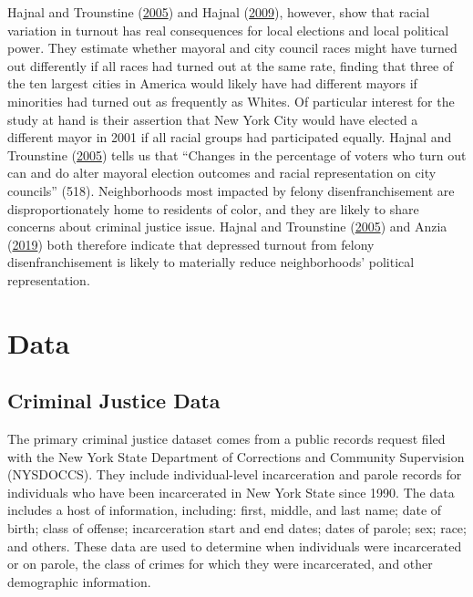 \documentclass[12pt,]{article}
\begin{document}
Hajnal and Trounstine (\protect\hyperlink{ref-Hajnal2005}{2005}) and Hajnal (\protect\hyperlink{ref-Hajnal2009}{2009}), however, show that racial variation in turnout has real consequences for local elections and local political power. They estimate whether mayoral and city council races might have turned out differently if all races had turned out at the same rate, finding that three of the ten largest cities in America would likely have had different mayors if minorities had turned out as frequently as Whites. Of particular interest for the study at hand is their assertion that New York City would have elected a different mayor in 2001 if all racial groups had participated equally. Hajnal and Trounstine (\protect\hyperlink{ref-Hajnal2005}{2005}) tells us that ``Changes in the percentage of voters who turn out can and do alter mayoral election outcomes and racial representation on city councils'' (518). Neighborhoods most impacted by felony disenfranchisement are disproportionately home to residents of color, and they are likely to share concerns about criminal justice issue. Hajnal and Trounstine (\protect\hyperlink{ref-Hajnal2005}{2005}) and Anzia (\protect\hyperlink{ref-Anzia2019}{2019}) both therefore indicate that depressed turnout from felony disenfranchisement is likely to materially reduce neighborhoods' political representation.

\hypertarget{data}{%
\section*{Data}\label{data}}

\hypertarget{criminal-justice-data}{%
\subsection*{Criminal Justice Data}\label{criminal-justice-data}}

The primary criminal justice dataset comes from a public records request filed with the New York State Department of Corrections and Community Supervision (NYSDOCCS). They include individual-level incarceration and parole records for individuals who have been incarcerated in New York State since 1990. The data includes a host of information, including: first, middle, and last name; date of birth; class of offense; incarceration start and end dates; dates of parole; sex; race; and others. These data are used to determine when individuals were incarcerated or on parole, the class of crimes for which they were incarcerated, and other demographic information.
\end{document}

